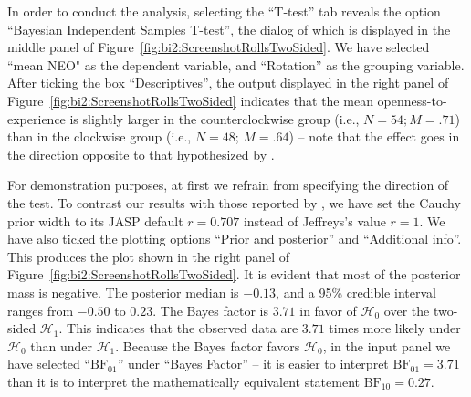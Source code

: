 In order to conduct the analysis, selecting the ``T-test'' tab reveals the option ``Bayesian Independent Samples T-test'', the dialog of which is displayed in the middle panel of Figure~\ref{fig:bi2:ScreenshotRollsTwoSided}. We have selected ``mean NEO" as the dependent variable, and ``Rotation'' as the grouping variable. After ticking the box ``Descriptives'', the output displayed in the right panel of Figure~\ref{fig:bi2:ScreenshotRollsTwoSided} indicates that the mean openness-to-experience is slightly larger in the counterclockwise group (i.e., $N = 54; M = .71$) than in the clockwise group (i.e., $N = 48$; $M = .64$) -- note that the effect goes in the direction opposite to that hypothesized by .

For demonstration purposes, at first we refrain from specifying the direction of the test. To contrast our results with those reported by , we have set the Cauchy prior width to its JASP default $r=0.707$ instead of Jeffreys's value $r=1$. We have also ticked the plotting options ``Prior and posterior'' and ``Additional info''. This produces the plot shown in the right panel of Figure~\ref{fig:bi2:ScreenshotRollsTwoSided}. It is evident that most of the posterior mass is negative. The posterior median is $-0.13$, and a 95\% credible interval ranges from $-0.50$ to $0.23$. The Bayes factor is $3.71$ in favor of $\mathcal{H}_0$ over the two-sided $\mathcal{H}_1$. This indicates that the observed data are $3.71$ times more likely under $\mathcal{H}_0$ than under $\mathcal{H}_1$. Because the Bayes factor favors $\mathcal{H}_0$, in the input panel we have selected ``$\text{BF}_{01}$'' under ``Bayes Factor'' -- it is easier to interpret $\text{BF}_{01} = 3.71$ than it is to interpret the mathematically equivalent statement $\text{BF}_{10} = 0.27$.

